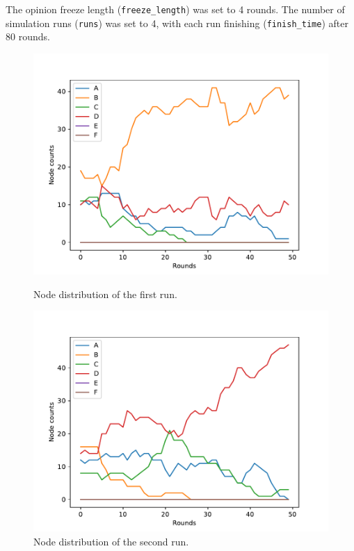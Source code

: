 \documentclass[11pt]{article}
\begin{document}
\medskip

\noindent The opinion freeze length (\verb|freeze_length|) was set to 4 rounds. The number of simulation runs (\verb|runs|) was set to 4, with each run finishing (\verb|finish_time|) after 80 rounds.

\begin{figure}[ht] 
  \label{ fig7} 
  \begin{minipage}[b]{0.5\linewidth}
    \centering
    \includegraphics[width=0.9\linewidth]{results/02/run-1/distribution} 
    \caption{Node distribution of the first run.} 
  \end{minipage}%
  \begin{minipage}[b]{0.5\linewidth}
    \centering
    \includegraphics[width=0.9\linewidth]{results/02/run-2/distribution} 
    \caption{Node distribution of the second run.}
  \end{minipage} 

\end{figure}
\end{document}

